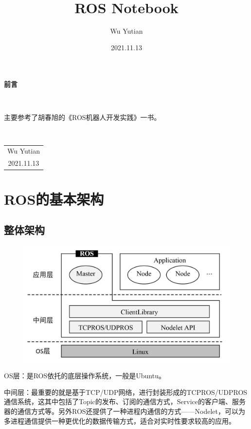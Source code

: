 \documentclass[10pt, oneside]{book}
\title{\Huge{\textbf{ROS Notebook}}}
\author{Wu Yutian}
\date{2021.11.13}
\begin{document}
\maketitle

\setcounter{page}{1}

\begin{center}
    \Huge\textbf{前言}
\end{center}~\

主要参考了胡春旭的《ROS机器人开发实践》一书。

~\\
\begin{flushright}     
    \begin{tabular}{c}
        Wu Yutian\\
        2021.11.13
    \end{tabular}
\end{flushright}

\newpage
{}
\setcounter{page}{1}
\tableofcontents
\newpage
\setcounter{page}{1}

\chapter{ROS的基本架构}

\section{整体架构}

\begin{figure}[H]
    \centering
    \includegraphics[width=0.6\linewidth]{image/ROS1架构.jpg}
\end{figure}

OS层：是ROS依托的底层操作系统，一般是Ubuntu。

中间层：最重要的就是基于TCP/UDP网络，进行封装形成的TCPROS/UDPROS通信系统，这其中包括了Topic的发布、订阅的通信方式，Service的客户端、服务器的通信方式等。另外ROS还提供了一种进程内通信的方式——Nodelet，可以为多进程通信提供一种更优化的数据传输方式，适合对实时性要求较高的应用。
\end{document}
